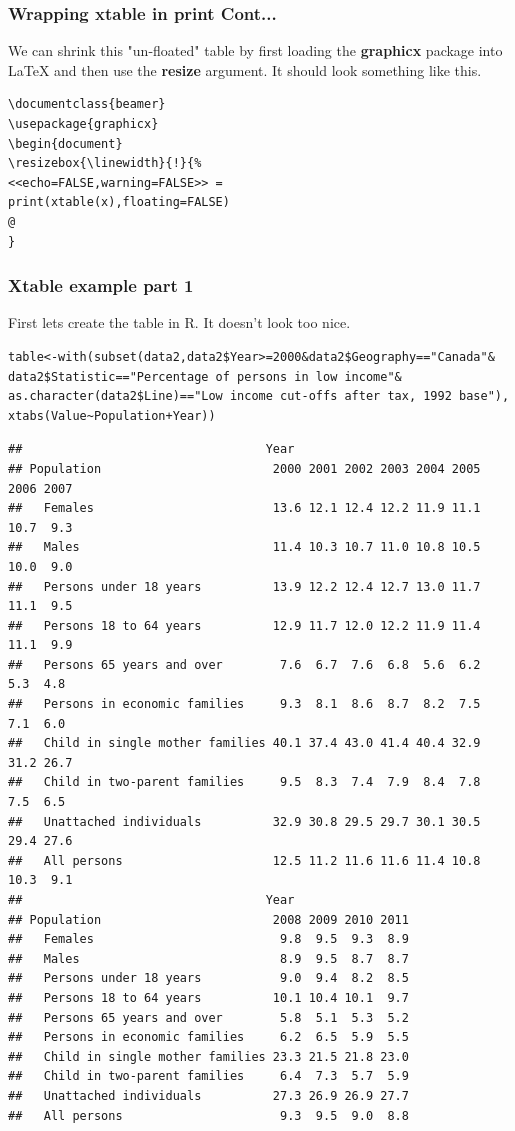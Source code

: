 \documentclass[nogin]{beamer}\usepackage[]{graphicx}\usepackage[]{color}
\makeatletter
\newenvironment{kframe}{%
 \def\at@end@of@kframe{}%
 \ifinner\ifhmode%
  \def\at@end@of@kframe{\end{minipage}}%
  \begin{minipage}{\columnwidth}%
 \fi\fi%
 \def\FrameCommand##1{\hskip\@totalleftmargin \hskip-\fboxsep
 \colorbox{shadecolor}{##1}\hskip-\fboxsep
     \hskip-\linewidth \hskip-\@totalleftmargin \hskip\columnwidth}%
 \MakeFramed {\advance\hsize-\width
   \@totalleftmargin\z@ \linewidth\hsize
   \@setminipage}}%
 {\par\unskip\endMakeFramed%
 \at@end@of@kframe}
\newenvironment{knitrout}{}{} %
\makeatother
\begin{document}
\begin{frame}[fragile]
\frametitle{Wrapping xtable in print Cont...}
We can shrink this "un-floated" table by first loading the \textbf{graphicx} package into LaTeX and then use the \textbf{resize} argument. It should look something like this.
\begin{verbatim}
\documentclass{beamer}
\usepackage{graphicx}
\begin{document}
\resizebox{\linewidth}{!}{%
<<echo=FALSE,warning=FALSE>> =
print(xtable(x),floating=FALSE)
@
}
\end{verbatim}
\end{frame}

\begin{frame}
\frametitle{Xtable example part 1}
First lets create the table in R. It doesn't look too nice.
\begin{verbatim}table<-with(subset(data2,data2$Year>=2000&data2$Geography=="Canada"&
data2$Statistic=="Percentage of persons in low income"&
as.character(data2$Line)=="Low income cut-offs after tax, 1992 base"),
xtabs(Value~Population+Year))
\end{verbatim}
\begin{knitrout}
\color{fgcolor}\begin{kframe}
\begin{verbatim}
##                                  Year
## Population                        2000 2001 2002 2003 2004 2005 2006 2007
##   Females                         13.6 12.1 12.4 12.2 11.9 11.1 10.7  9.3
##   Males                           11.4 10.3 10.7 11.0 10.8 10.5 10.0  9.0
##   Persons under 18 years          13.9 12.2 12.4 12.7 13.0 11.7 11.1  9.5
##   Persons 18 to 64 years          12.9 11.7 12.0 12.2 11.9 11.4 11.1  9.9
##   Persons 65 years and over        7.6  6.7  7.6  6.8  5.6  6.2  5.3  4.8
##   Persons in economic families     9.3  8.1  8.6  8.7  8.2  7.5  7.1  6.0
##   Child in single mother families 40.1 37.4 43.0 41.4 40.4 32.9 31.2 26.7
##   Child in two-parent families     9.5  8.3  7.4  7.9  8.4  7.8  7.5  6.5
##   Unattached individuals          32.9 30.8 29.5 29.7 30.1 30.5 29.4 27.6
##   All persons                     12.5 11.2 11.6 11.6 11.4 10.8 10.3  9.1
##                                  Year
## Population                        2008 2009 2010 2011
##   Females                          9.8  9.5  9.3  8.9
##   Males                            8.9  9.5  8.7  8.7
##   Persons under 18 years           9.0  9.4  8.2  8.5
##   Persons 18 to 64 years          10.1 10.4 10.1  9.7
##   Persons 65 years and over        5.8  5.1  5.3  5.2
##   Persons in economic families     6.2  6.5  5.9  5.5
##   Child in single mother families 23.3 21.5 21.8 23.0
##   Child in two-parent families     6.4  7.3  5.7  5.9
##   Unattached individuals          27.3 26.9 26.9 27.7
##   All persons                      9.3  9.5  9.0  8.8
\end{verbatim}
\end{kframe}
\end{knitrout}

\end{frame}
\end{document}
